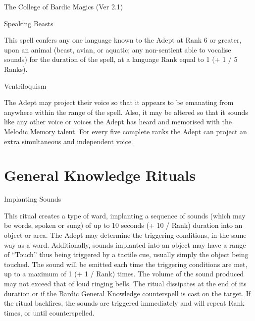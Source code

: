 \begin{Chapter}{The College of Bardic Magics (Ver 2.1)}
\begin{spell}[G-10]{Speaking Beasts}

\begin{effects}
This spell confers any one language known to the Adept at Rank 6 or
greater, upon an animal (beast, avian, or aquatic; any non-sentient
able to vocalise sounds) for the duration of the spell, at a language
Rank equal to 1 (+ 1 / 5 Ranks).
\end{effects}
\end{spell}

\begin{spell}[G-10]{Ventriloquism}

\begin{effects}
The Adept may project their voice so that it appears to be emanating
from anywhere within the range of the spell.  Also, it may be altered
so that it sounds like any other voice or voices the Adept has heard
and memorised with the Melodic Memory talent.  For every five complete
ranks the Adept can project an extra simultaneous and independent
voice.
\end{effects}
\end{spell}


\section{General Knowledge Rituals}

\begin{ritual}[Q-1]{Implanting Sounds}

\begin{effects}
This ritual creates a type of ward, implanting a sequence of sounds
(which may be words, spoken or sung) of up to 10 seconds (+ 10 / Rank)
duration into an object or area.  The Adept may determine the
triggering conditions, in the same way as a ward. Additionally, sounds
implanted into an object may have a range of “Touch” thus being
triggered by a tactile cue, usually simply the object being touched.
The sound will be emitted each time the triggering conditions are met,
up to a maximum of 1 (+ 1 / Rank) times.  The volume of the sound
produced may not exceed that of loud ringing bells. The ritual
dissipates at the end of its duration or if the Bardic General
Knowledge counterspell is cast on the target.  If the ritual
backfires, the sounds are triggered immediately and will repeat Rank
times, or until counterspelled.
\end{effects}
\end{ritual}


\end{Chapter}
